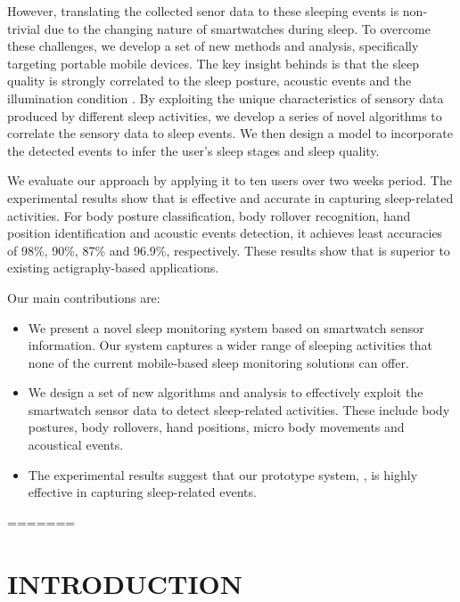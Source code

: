 However, translating the collected senor data to these sleeping events is non-trivial due to the changing nature of smartwatches during
sleep. To overcome these challenges, we develop a set of new methods and analysis, specifically targeting portable mobile devices.  The key
insight behinds {\systemname} is that the sleep quality is strongly correlated to the sleep posture, acoustic events and the illumination
condition \cite{shelgikar2016sleep}. By exploiting the unique characteristics of sensory data produced by different sleep activities, we
develop a series of novel algorithms to correlate the sensory data to sleep events. We then design a model to incorporate the detected
events to
infer the user's sleep stages and sleep quality.

We evaluate our approach by applying it to ten users over two weeks period. The experimental results show that {\systemname} is  effective
and accurate in capturing sleep-related activities. For body posture classification, body rollover recognition, hand position
identification and  acoustic events detection,  it achieves least accuracies of 98\%,  90\%,  87\% and  96.9\%, respectively. These results
show that {\systemname}  is superior to existing actigraphy-based applications.

Our main contributions are:

\begin{itemize}[itemsep=1mm,nolistsep]

\item We present a novel sleep monitoring system based on smartwatch sensor information. Our system captures a wider range of sleeping
    activities that none of the current mobile-based sleep monitoring solutions can offer.

\item We design a set of new algorithms and analysis to effectively exploit the smartwatch sensor data to detect sleep-related
    activities. These include body postures, body rollovers, hand positions, micro body movements and acoustical events.

\item The experimental results suggest that our prototype system, \systemname, is highly effective in capturing sleep-related events.

\end{itemize}
=======
\section{INTRODUCTION}\label{sec:1introduction}

